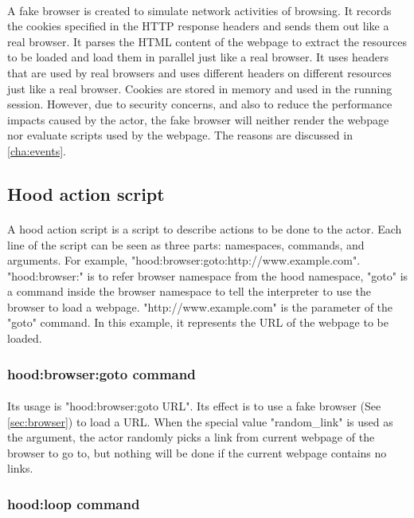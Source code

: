 \documentclass[mscthesis]{usiinfthesis}
\begin{document}
\paragraph{}
A fake browser is created to simulate network activities of browsing. It records the cookies specified in the HTTP response headers and sends them out like a real browser. It parses the HTML content of the webpage to extract the resources to be loaded and load them in parallel just like a real browser. It uses headers that are used by real browsers and uses different headers on different resources just like a real browser. Cookies are stored in memory and used in the running session. However, due to security concerns, and also to reduce the performance impacts caused by the actor, the fake browser will neither render the webpage nor evaluate scripts used by the webpage. The reasons are discussed in \cref{cha:events}.

\subsection{Hood action script}
\paragraph{}
A hood action script is a script to describe actions to be done to the actor. Each line of the script can be seen as three parts: namespaces, commands, and arguments. For example, \newline "hood:browser:goto:http://www.example.com". "hood:browser:" is to refer browser namespace from the hood namespace, "goto" is a command inside the browser namespace to tell the interpreter to use the browser to load a webpage. "http://www.example.com" is the parameter of the "goto" command. In this example, it represents the URL of the webpage to be loaded.
\subsubsection{hood:browser:goto command}
\paragraph{}
Its usage is "hood:browser:goto URL". Its effect is to use a fake browser (See \cref{sec:browser}) to load a URL. When the special value "random\_link" is used as the argument, the actor randomly picks a link from current webpage of the browser to go to, but nothing will be done if the current webpage contains no links.
\subsubsection{hood:loop command}
\end{document}
